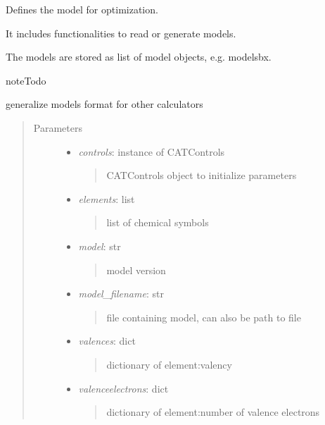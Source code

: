 \documentclass[letterpaper,10pt,english]{sphinxmanual}
\begin{document}
\begin{fulllineitems}
\label{classes:catparam.CATParam}
Defines the model for optimization.

It includes functionalities to read or generate models.

The models are stored as list of model objects, e.g. modelsbx.

\begin{notice}{note}{Todo}

generalize models format for other calculators
\end{notice}
\begin{quote}\begin{description}
\item[{Parameters}] \leavevmode\begin{itemize}
\item {} 
\emph{controls}: instance of CATControls
\begin{quote}

CATControls object to initialize parameters
\end{quote}

\item {} 
\emph{elements}: list
\begin{quote}

list of chemical symbols
\end{quote}

\item {} 
\emph{model}: str
\begin{quote}

model version
\end{quote}

\item {} 
\emph{model\_filename}: str
\begin{quote}

file containing model, can also be path to file
\end{quote}

\item {} 
\emph{valences}: dict
\begin{quote}

dictionary of element:valency
\end{quote}

\item {} 
\emph{valenceelectrons}: dict
\begin{quote}

dictionary of element:number of valence electrons
\begin{quote}


\end{quote}
\end{quote}
\end{itemize}
\end{description}
\end{quote}
\end{fulllineitems}
\end{document}
